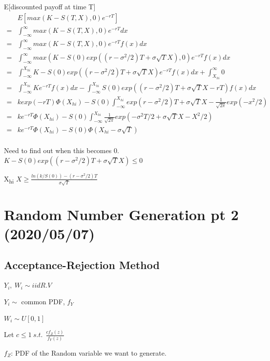\documentclass[11pt]{article}
\begin{document}
E[discounted payoff at time T]
\begin{equation}
  \begin{split}
   & E[max(K - S(T, X), 0) e^{-rT}]\\
= & \int_{-\infty}^{\infty} max(K - S(T, X), 0) e^{-rT} dx\\
= & \int_{-\infty}^{\infty} max(K - S(T, X), 0) e^{-rT} f(x) dx\\
= & \int_{-\infty}^{\infty} max(K - S(0)exp((r - \sigma^2/2)T + \sigma \sqrt{T} X), 0) e^{-rT} f(x) dx\\
= & \int_{-\infty}^{X_{hi}} K - S(0)exp((r - \sigma^2/2)T + \sigma \sqrt{T} X) e^{-rT} f(x) dx + \int_{X_{hi}}^{\infty} 0\\
= & \int_{-\infty}^{X_{hi}} K e^{-rT} f(x) dx - \int_{-\infty}^{X_{hi}} S(0)exp((r - \sigma^2/2)T + \sigma \sqrt{T} X - rT) f(x) dx\\
= & k exp(-rT) \Phi (X_{hi}) - S(0) \int_{-\infty}^{X_{hi}} exp(r - \sigma^2/2)T + \sigma \sqrt T X - \frac{1}{\sqrt{2 \pi}} exp(-x^2/2)\\
= & k e^{-rT} \Phi (X_{hi}) - S(0) \int_{-\infty}^{X_{hi}} \frac{1}{\sqrt{2 \pi}} exp(-\sigma^2 T/2 + \sigma \sqrt T X - X^2/2)\\
= & k e^{-rT} \Phi (X_{hi}) - S(0) \Phi (X_{hi} - \sigma \sqrt T)\\
  \end{split}
\end{equation}


Need to find out when this becomes 0.
\(K - S(0) exp((r - \sigma^2/2)T + \sigma \sqrt{T} X) \leq 0\)

X\textsubscript{hi}
\(X \geq \frac{ln(k/S(0)) - (r - \sigma^2/2)T}{\sigma \sqrt T}\)
\section{Random Number Generation pt 2 (2020/05/07)}
\label{sec:org50f10dc}

\subsection{Acceptance-Rejection Method}
\label{sec:org82d99a2}

\(Y_i, \ W_i \sim iid R.V\)

\(Y_i \sim\) common PDF, \(f_Y\)

\(W_i \sim U[0,1]\)

Let \(c  \leq 1 \ s.t. \ \ \frac{c f_Z (z)}{f_Y (z)}\)

\(f_Z\): PDF of the Random variable we want to generate.
\end{document}
